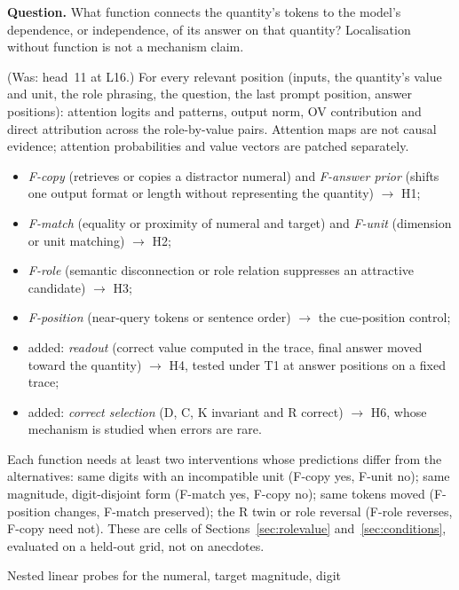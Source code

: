 \documentclass[10pt,a4paper]{article}
\begin{document}
\textbf{Question.} What function connects the quantity's tokens to the model's dependence, or independence, of
its answer on that quantity? Localisation without function is not a mechanism claim.

\begin{description}[leftmargin=1.2em,style=nextline]
\item[P7.1 Anatomy of each surviving component.] (Was: head~11 at L16.) For every relevant position (inputs, the
quantity's value and unit, the role phrasing, the question, the last prompt position, answer positions): attention
logits and patterns, output norm, OV contribution and direct attribution across the role-by-value pairs. Attention
maps are not causal evidence; attention probabilities and value vectors are patched separately.
\item[P7.2 Candidate functions tested head-to-head (kept), mapped to the revised hypotheses.]
\begin{itemize}[leftmargin=1.2em]
\item \emph{F-copy} (retrieves or copies a distractor numeral) and \emph{F-answer prior} (shifts one output format
or length without representing the quantity) $\to$ H1;
\item \emph{F-match} (equality or proximity of numeral and target) and \emph{F-unit} (dimension or unit matching)
$\to$ H2;
\item \emph{F-role} (semantic disconnection or role relation suppresses an attractive candidate) $\to$ H3;
\item \emph{F-position} (near-query tokens or sentence order) $\to$ the cue-position control;
\item added: \emph{readout} (correct value computed in the trace, final answer moved toward the quantity) $\to$ H4,
tested under T1 at answer positions on a fixed trace;
\item added: \emph{correct selection} (D, C, K invariant and R correct) $\to$ H6, whose mechanism is studied when
errors are rare.
\end{itemize}
Each function needs at least two interventions whose predictions differ from the alternatives: same digits with
an incompatible unit (F-copy yes, F-unit no); same magnitude, digit-disjoint form (F-match yes, F-copy no); same
tokens moved (F-position changes, F-match preserved); the R twin or role reversal (F-role reverses, F-copy need
not). These are cells of Sections~\ref{sec:rolevalue} and~\ref{sec:conditions}, evaluated on a held-out grid, not
on anecdotes.
\item[P7.3 Activation decoding with interventions.] Nested linear probes for the numeral, target magnitude, digit

\end{description}
\end{document}
